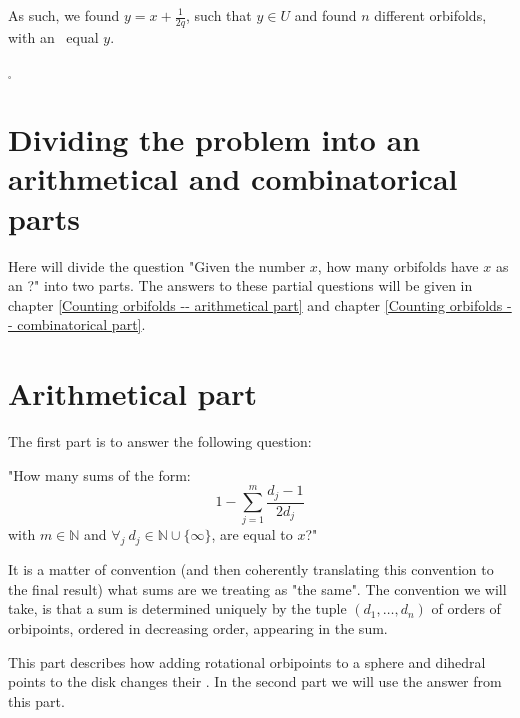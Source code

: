As such, we found $y = x + \frac{1}{2q}$, such that $y \in U$ and 
found $n$
different orbifolds, with an \Eoc\ equal $y$. 

$_\square$ 
 



\section{Dividing the problem into an arithmetical and combinatorical parts}
\label{dividing the problem}
Here will divide the question "Given the number $x$, how many orbifolds have $x$ as an \Eoc?" 
into two parts. The answers to these partial questions will be given in chapter
\ref{Counting orbifolds -- arithmetical part} and chapter
\ref{Counting orbifolds -- combinatorical part}.   
\section{Arithmetical part}\label{arithmetical part}
The first part is to answer the following question:

"How many sums of the form:
\begin{equation}\label{counting D2}
1-\sum_{j=1}^m \frac{d_j-1}{2d_j} 
\end{equation} 
with $m\in \mathbb{N}$ and $\forall_j\ d_j\in\mathbb{N}\cup\{\infty\}$, are equal to $x$?"

It is a matter of convention (and then coherently translating this convention to the final result) 
what sums are we treating as "the same". The convention we will take, is that a sum is determined 
uniquely by the tuple $(d_1,\dots,d_n)$ 
of orders 
of orbipoints, ordered in decreasing order, appearing in the sum. 

This part describes how adding rotational orbipoints to a sphere and dihedral points 
to the disk changes their \Eoc. 
In the second part we will use the answer from this part.
